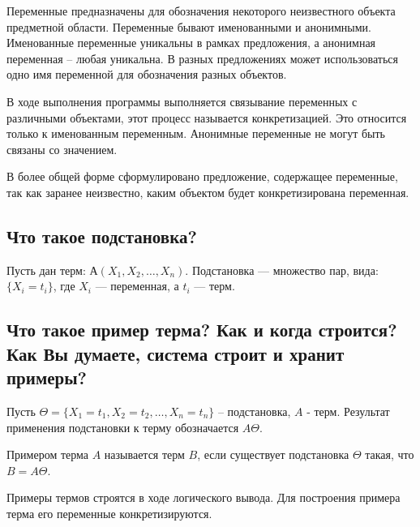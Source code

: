 Переменные предназначены для обозначения некоторого неизвестного объекта предметной области. Переменные бывают именованными и анонимными. Именованные переменные уникальны в рамках предложения, а анонимная переменная – любая уникальна. В разных предложениях может использоваться одно имя переменной для обозначения разных объектов.

В ходе выполнения программы выполняется связывание переменных с различными объектами, этот процесс называется конкретизацией. Это относится только к именованным переменным. Анонимные переменные не могут быть связаны со значением.

В более общей форме сформулировано предложение, содержащее переменные, так как заранее неизвестно, каким объектом будет конкретизирована переменная.

\subsection{Что такое подстановка?}

Пусть дан терм: $А(X_1, X_2, \ldots , X_n)$.
Подстановка --- множество пар, вида: \\ $\{X _ i = t _ i\}$, где $X_i$ --- переменная, а $t_i$ --- терм.

\subsection{Что такое пример терма? Как и когда строится? Как Вы думаете, система строит и хранит примеры?}

Пусть $\Theta =  \{X_1 = t_1, X_2= t_2, \dots , X_n = t_n \}$   –   подстановка, $A$ - терм. Результат применения подстановки к терму обозначается $A\Theta$.

Примером терма $A$ называется терм $B$, если существует подстановка $\Theta$ такая, что $B = A\Theta$.

Примеры термов строятся в ходе логического вывода. Для построения примера терма его переменные конкретизируются.
